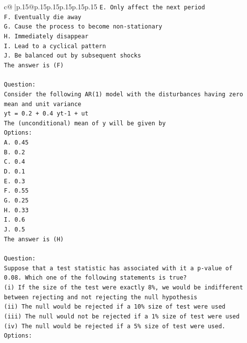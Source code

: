 \documentclass{article}
\begin{document}
{\begin{supertabular}{c@{$\;$}|p{.15\linewidth}@{}p{.15\linewidth}p{.15\linewidth}p{.15\linewidth}p{.15\linewidth}p{.15\linewidth}}
{{{\texttt{E. Only affect the next period} \\
\texttt{F. Eventually die away} \\
\texttt{G. Cause the process to become non{-}stationary} \\
\texttt{H. Immediately disappear} \\
\texttt{I. Lead to a cyclical pattern} \\
\texttt{J. Be balanced out by subsequent shocks} \\
\texttt{The answer is (F)} \\
\\ 
\texttt{Question:} \\
\texttt{Consider the following AR(1) model with the disturbances having zero mean and unit variance} \\
\texttt{yt = 0.2 + 0.4 yt{-}1 + ut} \\
\texttt{The (unconditional) mean of y will be given by} \\
\texttt{Options:} \\
\texttt{A. 0.45} \\
\texttt{B. 0.2} \\
\texttt{C. 0.4} \\
\texttt{D. 0.1} \\
\texttt{E. 0.3} \\
\texttt{F. 0.55} \\
\texttt{G. 0.25} \\
\texttt{H. 0.33} \\
\texttt{I. 0.6} \\
\texttt{J. 0.5} \\
\texttt{The answer is (H)} \\
\\ 
\texttt{Question:} \\
\texttt{Suppose that a test statistic has associated with it a p{-}value of 0.08. Which one of the following statements is true?} \\
\texttt{(i) If the size of the test were exactly 8\%, we would be indifferent between rejecting and not rejecting the null hypothesis} \\
\texttt{(ii) The null would be rejected if a 10\% size of test were used} \\
\texttt{(iii) The null would not be rejected if a 1\% size of test were used} \\
\texttt{(iv) The null would be rejected if a 5\% size of test were used.} \\
\texttt{Options:} \\
}}}
\end{supertabular}}
\end{document}
